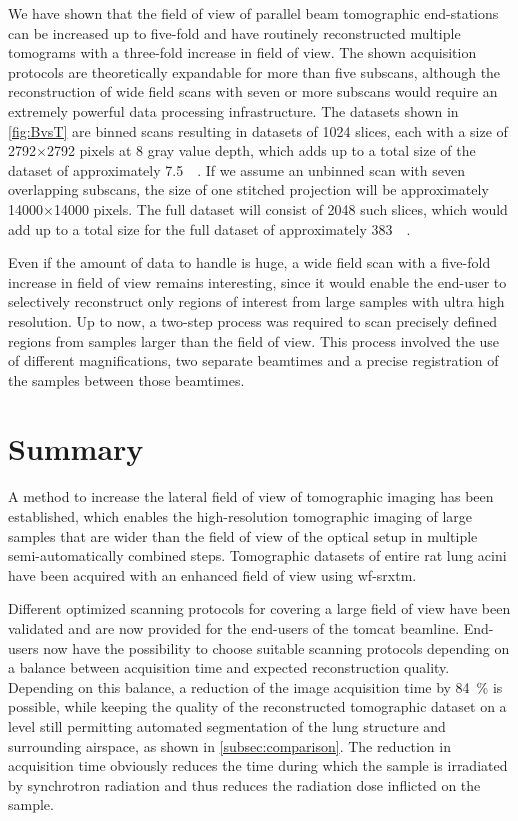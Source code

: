 We have shown that the field of view of parallel beam tomographic end-stations can be increased up to five-fold and have routinely reconstructed multiple tomograms with a three-fold increase in field of view. The shown acquisition protocols are theoretically expandable for more than five subscans, although the reconstruction of wide field scans with seven or more subscans would require an extremely powerful data processing infrastructure. The datasets shown in \autoref{fig:BvsT} are binned scans resulting in datasets of 1024 slices, each with a size of 2792$\times$2792 pixels at \SI{8}{\bit} gray value depth, which adds up to a total size of the dataset of approximately \SI{7.5}{\giga\byte}. If we assume an unbinned scan with seven overlapping subscans, the size of one stitched projection will be approximately 14000$\times$14000 pixels. The full dataset will consist of 2048 such slices, which would add up to a total size for the full dataset of approximately \SI{383}{\giga\byte}.

Even if the amount of data to handle is huge, a wide field scan with a five-fold increase in field of view remains interesting, since it would enable the end-user to selectively reconstruct only regions of interest from large samples with ultra high resolution. Up to now, a two-step process was required to scan precisely defined regions from samples larger than the field of view. This process involved the use of different magnifications, two separate beamtimes and a precise registration of the samples between those beamtimes.

\section{Summary}\label{summary}
A method to increase the lateral field of view of tomographic imaging has been established, which enables the high-resolution tomographic imaging of large samples that are wider than the field of view of the optical setup in multiple semi-automatically combined steps. Tomographic datasets of entire rat lung acini have been acquired with an enhanced field of view using \ac{wf-srxtm}.

Different optimized scanning protocols for covering a large field of view have been validated and are now provided for the end-users of the \ac{tomcat} beamline. End-users now have the possibility to choose suitable scanning protocols depending on a balance between acquisition time and expected reconstruction quality. Depending on this balance, a reduction of the image acquisition time by \SI{84}{\percent} is possible, while keeping the quality of the reconstructed tomographic dataset on a level still permitting automated segmentation of the lung structure and surrounding airspace, as shown in \autoref{subsec:comparison}. The reduction in acquisition time obviously reduces the time during which the sample is irradiated by synchrotron radiation and thus reduces the radiation dose inflicted on the sample.

